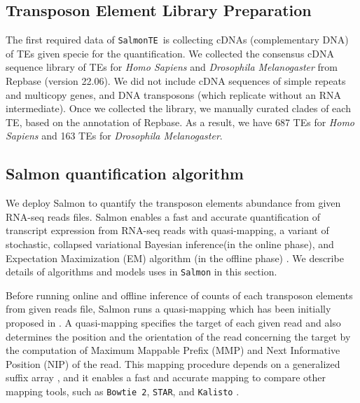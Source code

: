\documentclass{ws-procs11x85}
\newcommand{\SalmonTE}{\texttt{SalmonTE}}
\begin{document}
\subsection{Transposon Element Library Preparation}
The first required data of \SalmonTE~is collecting cDNAs (complementary DNA) of TEs given specie for the quantification.
We collected the consensus cDNA sequence library of TEs for \textit{Homo Sapiens} and \textit{Drosophila Melanogaster} from Repbase  
(version 22.06)\cite{repbase}. We did not include cDNA sequences of simple repeats and multicopy genes, and DNA transposons (which replicate without an RNA intermediate). 
Once we collected the library, we manually curated clades of each TE, based on the annotation of Repbase. As a result, we have 687 TEs for \textit{Homo Sapiens} and 163 TEs for \textit{Drosophila Melanogaster}.

\subsection{Salmon quantification algorithm}

We deploy Salmon\cite{patro2017salmon} to quantify the transposon elements abundance from given RNA-seq reads files. Salmon enables a fast and accurate quantification of transcript expression from RNA-seq reads with quasi-mapping, a variant of stochastic, collapsed variational Bayesian inference(in the online phase), and Expectation Maximization (EM) algorithm (in the offline phase)
\cite{patro2017salmon,srivastava2016rapmap,bishop2006pattern,foulds2013stochastic}. 
We describe details of algorithms and models uses in \verb|Salmon| in this section.

Before running online and offline inference of counts of each transposon elements from given reads file,
Salmon runs a quasi-mapping which has been initially proposed in \cite{srivastava2016rapmap}. A quasi-mapping specifies the target of each given read and also determines the position and the orientation of the read concerning the target by the computation of 
Maximum Mappable Prefix (MMP) \cite{li2012exploring} and Next Informative Position (NIP) \cite{srivastava2016rapmap} of the read.
This mapping procedure depends on a generalized suffix array \cite{manber1993suffix}, 
and it enables a fast and accurate mapping to compare other mapping tools, such as \verb|Bowtie 2|, \verb|STAR|, and \verb|Kalisto| \cite{srivastava2016rapmap}. 
\end{document}
